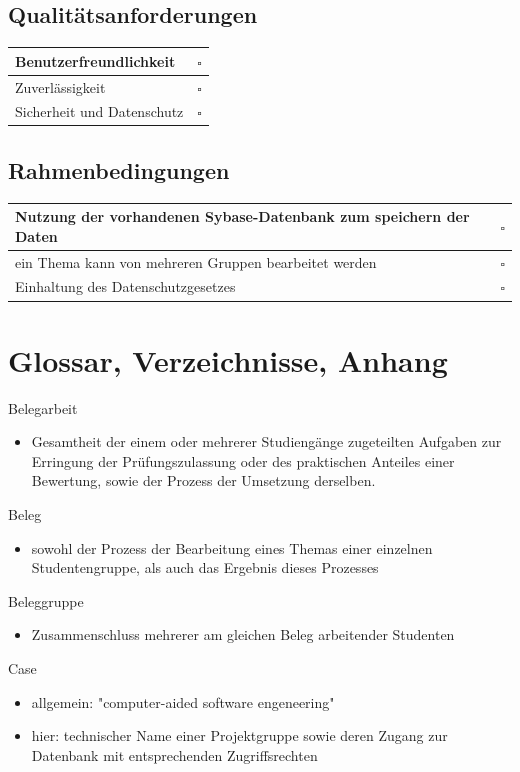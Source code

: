 \documentclass{article}
\begin{document}
\subsection{Qualitätsanforderungen}
\begin{tabular}{p{17cm} c}
	Benutzerfreundlichkeit		&	$\square$	\\
\hline
	Zuverlässigkeit				&	$\square$	\\
\hline
	Sicherheit und Datenschutz	&	$\square$	\\
\end{tabular}

\subsection{Rahmenbedingungen}
\begin{tabular}{p{17cm} c}
	Nutzung der vorhandenen Sybase-Datenbank zum speichern der Daten	&	$\square$	\\
\hline
	ein Thema kann von mehreren Gruppen bearbeitet werden				&	$\square$	\\
\hline
	Einhaltung des Datenschutzgesetzes									&	$\square$	\\
\end{tabular}
\newpage

\section{Glossar, Verzeichnisse, Anhang}
Belegarbeit
\begin{itemize} 
\item Gesamtheit der einem oder mehrerer Studiengänge zugeteilten Aufgaben zur Erringung der Prüfungszulassung oder des praktischen Anteiles einer Bewertung, sowie der Prozess der Umsetzung derselben.
\end{itemize}

Beleg
\begin{itemize} 
\item sowohl der Prozess der Bearbeitung eines Themas einer einzelnen Studentengruppe, als auch das Ergebnis dieses Prozesses
\end{itemize}

Beleggruppe
\begin{itemize} 
\item Zusammenschluss mehrerer am gleichen Beleg arbeitender Studenten
\end{itemize}

Case
\begin{itemize} 
\item allgemein: "computer-aided software engeneering"
\item hier: technischer Name einer Projektgruppe sowie deren Zugang zur Datenbank mit entsprechenden Zugriffsrechten
\end{itemize}
\end{document}
